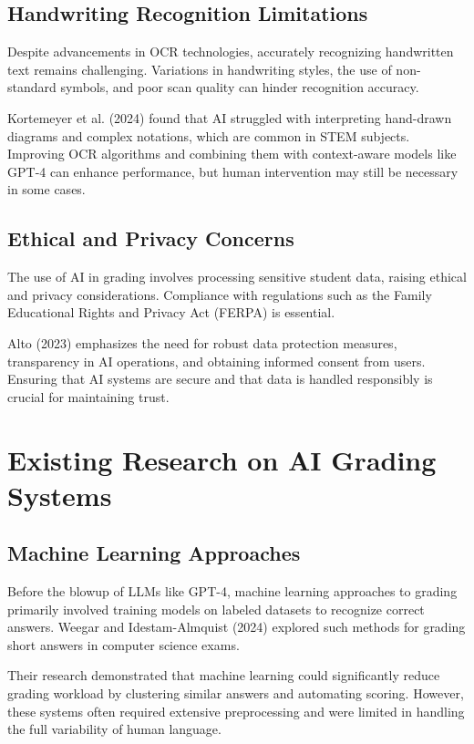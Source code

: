 \documentclass[ms,twoside,print]{nuthesis}
\begin{document}
\subsection{Handwriting Recognition Limitations}

Despite advancements in OCR technologies, accurately recognizing handwritten text remains challenging. Variations in handwriting styles, the use of non-standard symbols, and poor scan quality can hinder recognition accuracy.

Kortemeyer et al. (2024) \cite{Kortemeyer2024} found that AI struggled with interpreting hand-drawn diagrams and complex notations, which are common in STEM subjects. Improving OCR algorithms and combining them with context-aware models like GPT-4 can enhance performance, but human intervention may still be necessary in some cases.

\subsection{Ethical and Privacy Concerns}

The use of AI in grading involves processing sensitive student data, raising ethical and privacy considerations. Compliance with regulations such as the Family Educational Rights and Privacy Act (FERPA) is essential.

Alto (2023) \cite{Alto2023} emphasizes the need for robust data protection measures, transparency in AI operations, and obtaining informed consent from users. Ensuring that AI systems are secure and that data is handled responsibly is crucial for maintaining trust.

\section{Existing Research on AI Grading Systems}

\subsection{Machine Learning Approaches}

Before the blowup of LLMs like GPT-4, machine learning approaches to grading primarily involved training models on labeled datasets to recognize correct answers. Weegar and Idestam-Almquist (2024) \cite{RebeckaWeegar2024} explored such methods for grading short answers in computer science exams.

Their research demonstrated that machine learning could significantly reduce grading workload by clustering similar answers and automating scoring. However, these systems often required extensive preprocessing and were limited in handling the full variability of human language.
\end{document}
